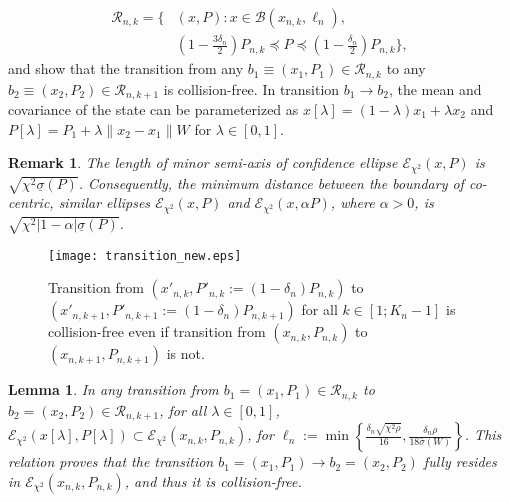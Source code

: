 \documentclass[Afour,sageh,times]{sagej}
\newtheorem{remark}{\bf Remark}
\newtheorem{lemma}{\bf Lemma}
\begin{document}
\begin{align}
\nonumber
    \mathcal{R}_{n,k}=\{&(x,P): x\in \mathcal{B}(x_{n,k},\ell_n), \\ \label{eq:R_n_def}
    &\left(1-\frac{3 \delta_n}{2}\right) P_{n,k} \preceq P\preceq \left(1-\frac{\delta_n}{2}\right) P_{n,k}\},
\end{align} 
and show that the transition from any $b_1\equiv(x_1, P_1) \in \mathcal{R}_{n,k}$ to any $b_2\equiv(x_2, P_2) \in \mathcal{R}_{n,k+1}$ is collision-free.
In transition $b_1\rightarrow b_2$, the mean and  covariance of the state can be parameterized as $x[\lambda] = (1-\lambda)x_1+\lambda x_2$ and  $P[\lambda]=P_1+\lambda \|x_2-x_1\|W$ for $\lambda\in[0,1]$.
\begin{remark}\label{remark:semi-axis}
\normalfont The length of minor semi-axis of confidence ellipse $\mathcal{E}_{\chi^2}(x,P)$ is $\sqrt{\chi^2 \underline{\sigma}(P)}$. Consequently, the minimum distance between the boundary of co-centric, similar ellipses   $\mathcal{E}_{\chi^2}(x,P)$ and  $\mathcal{E}_{\chi^2}(x, \alpha P)$, where $\alpha > 0$, is $\sqrt{\chi^2 |1-\alpha|\underline{\sigma}(P)}$. 
\end{remark}

\begin{figure}[ht!]
\centering
\texttt{[image: transition\_new.eps]}
\caption{Transition from $(x'_{n,k}, P'_{n,k}:=(1-\delta_n)P_{n,k})$ to $(x'_{n,k+1}, P'_{n,k+1}:=(1-\delta_n)P_{n,k+1})$ for all $k\in[1;K_n-1]$ is collision-free even if transition from $(x_{n,k}, P_{n,k})$ to $(x_{n,k+1}, P_{n,k+1})$ is not.}
\label{fig:transition}
\end{figure}


\begin{lemma}
\label{lemma:rn}
 \normalfont In any transition from $b_1=(x_1, P_1) \in \mathcal{R}_{n,k}$ to $b_2=(x_2, P_2) \in \mathcal{R}_{n,k+1}$, 
 for all $\lambda\in[0,1]$,
 $ \mathcal{E}_{\chi^2} (x[\lambda], P[\lambda]) \subset\mathcal{E}_{\chi^2} (x_{n,k},P_{n,k})$, for $    \ell_n:=\min\left\{\frac{\delta_n\sqrt{ \chi^2 \rho} }{16},\frac{\delta_n\rho }{18\bar{\sigma}(W)}\right\}$. This relation proves that the transition $b_1=(x_1,P_1)\rightarrow b_2=(x_2,P_2)$ fully resides in $\mathcal{E}_{\chi^2} (x_{n,k},P_{n,k})$, and thus it is collision-free. 
\\ \label{eq:final_in}

\end{lemma}
\end{document}
